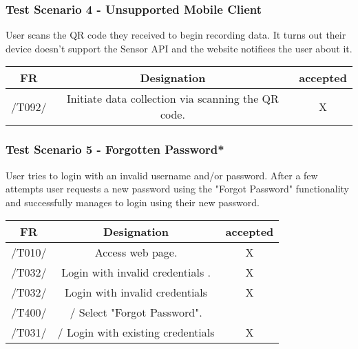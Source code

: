 \subsubsection{Test Scenario 4 - Unsupported Mobile Client}
User scans the QR code they received to begin recording data. It turns out their device
doesn't support the Sensor API and the website notifiees the user about it.
\begin{table}[h]
\begin{tabular}{!{\VRule}c!{\VRule}c!{\VRule}c!{\VRule}}
\hline
FR     & Designation                                                                    &accepted                \\
\hline
 /T092/ &  Initiate data collection via scanning the QR code. & X {\color[HTML]{67FD9A} } \\
 \hline


\end{tabular}
\end{table}
\clearpage
\subsubsection{Test Scenario 5 - Forgotten Password*}
User tries to login with an invalid username and/or password. After a few attempts
user requests a new password using the "Forgot Password" functionality and successfully
manages to login using their new password.

\begin{table}[h]
\begin{tabular}{!{\VRule}c!{\VRule}c!{\VRule}c!{\VRule}}
\hline
FR     & Designation                                                                   &accepted                \\
\hline
/T010/ & Access web page.                                                             &  X {\color[HTML]{67FD9A} } \\
\hline
/T032/ & Login with invalid credentials                               .                                                 &  X {\color[HTML]{67FD9A} } \\
\hline
/T032/ & Login with invalid credentials                                                 &  X {\color[HTML]{67FD9A} }                \\
\hline
 /T400/ &  / Select "Forgot Password".&  {\color[HTML]{67FD9A} } \\
 \hline
  /T031/ &  /  Login with existing credentials&   X {\color[HTML]{67FD9A} } \\
  \hline

\end{tabular}
\end{table}

